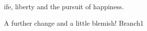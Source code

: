 \documentclass{article}
\begin{document}
ife, liberty and the pursuit of happiness.

A further change and a little blemish! Branch1
\end{document}
